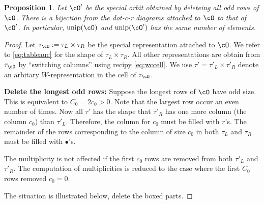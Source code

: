 \documentclass[12pt,a4paper]{amsart}
\numberwithin{equation}{section}
\newtheorem{prop}[thm]{Proposition}
\theoremstyle{remark}
\def\unip{\mathrm{unip}}
\begin{document}
\begin{prop}\label{prop:reduction.C}
  Let $\cO'$ be the special orbit obtained by deleteing all odd rows of $\cO$.
  There is a bijection from the dot-c-r diagrams attached to $\cO$ to that of
  $\cO'$.  In particular, $\unip(\cO)$ and $\unip(\cO')$ has the same number of
  elements.
\end{prop}
\begin{proof}
  Let $\tau_\cO :=\tau_L\times \tau_R$ be the special representation attached to
  $\cO$.  We refer to \eqref{eq:tableauc} for the shape of
  $\tau_L\times \tau_R$.  All other representations are obtain from $\tau_\cO$
  by ``switching columns'' using recipy \eqref{eq:wccell}. We use
  $\tau' = \tau'_L\times \tau'_R$ denote an arbitary $W$-representation in the
  cell of $\tau_\cO$.

  \textbf{Delete the longest odd rows: } Suppose the longest rows of $\cO$ have
  odd size. This is equivalent to $C_0 = 2c_0 >0$. Note that the largest row
  occur an even number of times.  Now all $\tau'$ has the shape that $\tau'_R$
  has one more column (the column $c_0$) than $\tau'_L$.  Therefore, the column
  for $c_0$ must be filled with $r$'s. The remainder of the rows corresponding
  to the column of size $c_0$ in both $\tau_L$ and $\tau_R$ must be filled with
  $\bullet'$s.



  The multiplicity is not affected if the first $c_0$ rows are removed from both
  $\tau'_L$ and $\tau'_R$. The computation of multiplicities is reduced to the
  case where the first $C_0$ rows removed $c_0=0$.

  The situation is illustrated below, delete the boxed parts.



\end{proof}
\end{document}
